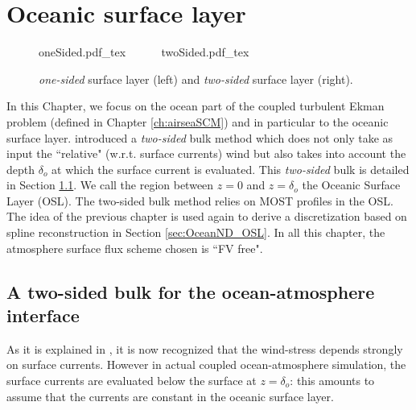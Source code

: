 \chapter{Oceanic surface layer}
\label{ch:OceanND}
\minitoc
\begin{figure}
	\centering
	{oneSided.pdf_tex}
	~~~~~
	{twoSided.pdf_tex}
	\caption{\textit{one-sided} surface layer
	(left) and \textit{two-sided} surface layer (right).}
	\label{fig:OceanND_twoSidedBulk_drawing}
\end{figure}
In this Chapter, we focus on the ocean part of the coupled turbulent
Ekman problem (defined in Chapter \ref{ch:airseaSCM})
and in particular to the oceanic surface layer.
\citep{pelletier_two-sided_2021} introduced a \textit{two-sided}
bulk method which does not only take as input
the ``relative" (w.r.t. surface currents) wind but also takes into
account the depth $\delta_o$ at which the surface current
is evaluated.
This \textit{two-sided} bulk is detailed in Section
\ref{sec:OceanND_twoSidedBulk}.
We call the region between $z=0$ and
$z=\delta_o$ the Oceanic Surface Layer (OSL).
The two-sided bulk method relies on MOST profiles in the OSL.
The idea of the previous chapter is used again to
derive a discretization based on spline reconstruction
in Section \ref{sec:OceanND_OSL}.
In all this chapter, the atmosphere surface flux scheme chosen
is ``FV free".
\section{A two-sided bulk for the ocean-atmosphere interface}
\label{sec:OceanND_twoSidedBulk}
As it is explained in \citep{pelletier_two-sided_2021}, it is now
recognized that the wind-stress depends strongly on surface currents. 
However in actual coupled ocean-atmosphere simulation,
the surface currents are evaluated below the surface at $z=\delta_o$:
this amounts to assume that the currents are constant in the
oceanic surface layer.

